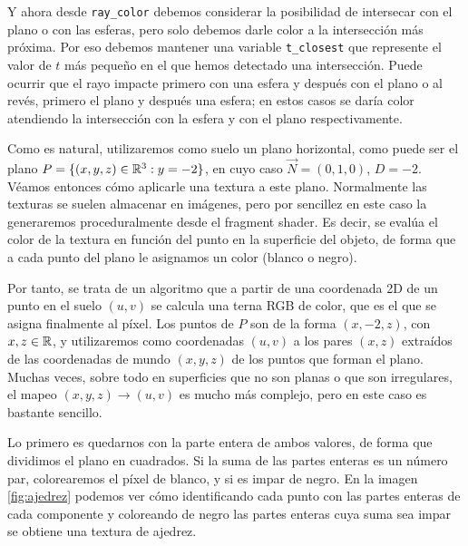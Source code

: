 Y ahora desde \verb|ray_color| debemos considerar la posibilidad de intersecar con el plano o con las esferas, pero solo debemos darle color a la intersección más próxima. Por eso debemos mantener una variable \verb|t_closest| que represente el valor de $t$ más pequeño en el que hemos detectado una intersección. Puede ocurrir que el rayo impacte primero con una esfera y después con el plano o al revés, primero el plano y después una esfera; en estos casos se daría color atendiendo la intersección con la esfera y con el plano respectivamente. 

Como es natural, utilizaremos como suelo un plano horizontal, como puede ser el plano $P=\{(x,y,z)\in\mathbb{R}^3:y=-2\}$, en cuyo caso $\vec N=(0,1,0)$, $D=-2$. Véamos entonces cómo aplicarle una textura a este plano. Normalmente las texturas se suelen almacenar en imágenes, pero por sencillez en este caso la generaremos proceduralmente desde el fragment shader. Es decir, se evalúa el color de la textura en función del punto en la superficie del objeto, de forma que a cada punto del plano le asignamos un color (blanco o negro). 

Por tanto, se trata de un algoritmo que a partir de una coordenada 2D de un punto en el suelo $(u,v)$ se calcula una terna RGB de color, que es el que se asigna finalmente al píxel. Los puntos de $P$ son de la forma $(x,-2,z)$, con $ x,z\in\mathbb{R}$, y utilizaremos como coordenadas $(u,v)$ a los pares $(x,z)$ extraídos de las coordenadas de mundo $(x,y,z)$ de los puntos que forman el plano. Muchas veces, sobre todo en superficies que no son planas o que son irregulares, el mapeo $(x,y,z)\longrightarrow(u,v)$ es mucho más complejo, pero en este caso es bastante sencillo.

Lo primero es quedarnos con la parte entera de ambos valores, de forma que dividimos el plano en cuadrados. Si la suma de las partes enteras es un número par, colorearemos el píxel de blanco, y si es impar de negro. En la imagen \ref{fig:ajedrez} podemos ver cómo identificando cada punto con las partes enteras de cada componente y coloreando de negro las partes enteras cuya suma sea impar se obtiene una textura de ajedrez.

